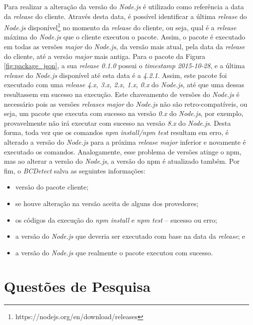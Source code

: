 Para realizar a alteração da versão do \textit{Node.js} é utilizado como referência a data da \textit{release} do cliente. Através desta data, é possível identificar a última \textit{release} do \textit{Node.js} disponível\footnote{https://nodejs.org/en/download/releases} no momento da \textit{release} do cliente, ou seja, qual é a \textit{release} máxima do \textit{Node.js} que o cliente executou o pacote. Assim, o pacote é executado em todas as versões \textit{major} do \textit{Node.js}, da versão mais atual, pela data da \textit{release} do cliente, até a versão \textit{major} mais antiga. Para o pacote da Figura \ref{fig:package_json}, a sua \textit{release 0.1.0} possui o \textit{timestamp 2015-10-28}, e a última \textit{release} do \textit{Node.js} disponível até esta data é a \textit{4.2.1}. Assim, este pacote foi executado com uma \textit{release 4.x, 3.x, 2.x, 1.x, 0.x} do \textit{Node.js}, até que uma dessas resultassem em sucesso na execução. Este chaveamento de versões do \textit{Node.js} é necessário pois as versões \textit{releases major} do \textit{Node.js} não são retro-compatíveis, ou seja, um pacote que executa com sucesso na versão \textit{0.x} do \textit{Node.js}, por exemplo, provavelmente não irá executar com sucesso na versão \textit{8.x} do \textit{Node.js}. Desta forma, toda vez que os comandos \textit{npm install/npm test} resultam em erro, é alterado a versão do \textit{Node.js} para a próxima \textit{release major} inferior e novamente é executado os comandos. Analogamente, esse problema de versões atinge o \gls{npm}, mas ao alterar a versão do \textit{Node.js}, a versão do \gls{npm} é atualizado também. Por fim, o \textit{BCDetect} salva as seguintes informações:

\begin{itemize}
    \item versão do pacote cliente;
    \item se houve alteração na versão aceita de alguns dos provedores;
    \item os códigos da execução do \textit{npm install} e \textit{npm test} -- sucesso ou erro;
    \item a versão do \textit{Node.js} que deveria ser executado com base na data da \textit{release}; e
    \item a versão do \textit{Node.js} que realmente o pacote executou com sucesso.
\end{itemize}{}

\section{Questões de Pesquisa}
\label{sec:qp}

